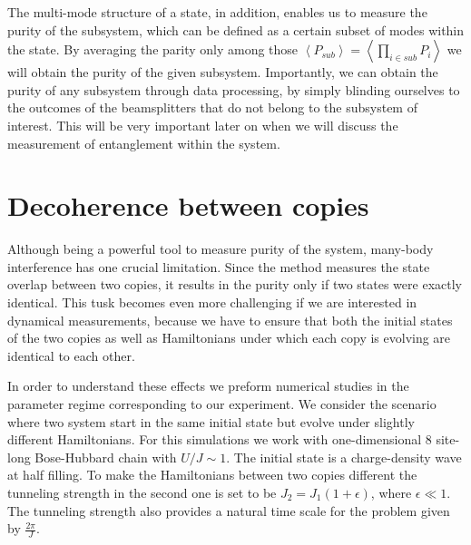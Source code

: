 The multi-mode structure of a state, in addition, enables us to measure the purity of the subsystem, which can be defined as a certain subset of modes within the state. By averaging the parity only among those $\left<P_{sub}\right> = \left< \prod_{i \in sub} P_i \right>$ we will obtain the purity of the given subsystem.  Importantly, we can obtain the purity of any subsystem through data processing, by simply blinding ourselves to the outcomes of the beamsplitters that do not belong to the subsystem of interest. This will be very important later on when we will discuss the measurement of entanglement within the system.

\section{Decoherence between copies}
Although being a powerful tool to measure purity of the system, many-body interference has one crucial limitation. Since the method measures the state overlap between two copies, it results in the purity only if two states were exactly identical. This tusk becomes even more challenging if we are interested in dynamical measurements, because we have to ensure that both the initial states of the two copies as well as Hamiltonians under which each copy is evolving are identical to each other.

In order to understand these effects we preform numerical studies in the parameter regime corresponding to our experiment. We consider the scenario where two system start in the same initial state but evolve under slightly different Hamiltonians. For this simulations we work with one-dimensional $8$ site-long Bose-Hubbard chain with $U/J\sim1$. The initial state is a charge-density wave at half filling. To make the Hamiltonians between two copies different the tunneling strength in the second one is set to be $J_2 = J_1(1+\epsilon)$, where $\epsilon \ll 1$. The tunneling strength also provides a natural time scale for the problem given by $\frac{2 \pi}{J}$.

